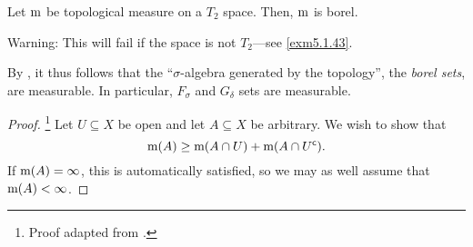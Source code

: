 \begin{prp}\label{prp5.1.57}
Let $\mathrm{m}$ be topological measure on a $T_2$ space.  Then, $\mathrm{m}$ is borel.
\begin{rmk}
Warning:  This will fail if the space is not $T_2$---see \cref{exm5.1.43}.
\end{rmk}
\begin{rmk}
By , it thus follows that the ``$\sigma$-algebra generated by the topology'', the \emph{borel sets}, are measurable.  In particular, $F_\sigma$ and $G_\delta$ sets are measurable.
\end{rmk}
\begin{proof}\footnote{Proof adapted from \cite[pg.~194]{Cohn}.}
Let $U\subseteq X$ be open and let $A\subseteq X$ be arbitrary.  We wish to show that
\begin{equation}
\mathrm{m} (A)\geq \mathrm{m} (A\cap U)+\mathrm{m} (A\cap U^{\mathsf{c}}).
\end{equation}
If $\mathrm{m} (A)=\infty$, this is automatically satisfied, so we may as well assume that $\mathrm{m} (A)<\infty$.


\end{proof}
\end{prp}
